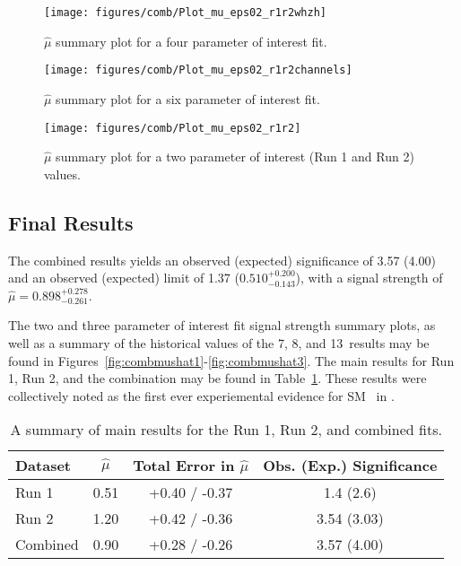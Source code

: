 \begin{figure}[!htbp]\captionsetup{justification=centering}
  \begin{center}
  \texttt{[image: figures/comb/Plot\_mu\_eps02\_r1r2whzh]}
  \caption{$\hat{\mu}$ summary plot for a four parameter of interest fit.}
  \label{fig:combmushat4}
  \end{center}
\end{figure}

\begin{figure}[!htbp]\captionsetup{justification=centering}
  \begin{center}
  \texttt{[image: figures/comb/Plot\_mu\_eps02\_r1r2channels]}
  \caption{$\hat{\mu}$ summary plot for a six parameter of interest fit.}
  \label{fig:combmushat5}
  \end{center}
\end{figure}

\begin{figure}[!htbp]\captionsetup{justification=centering}
  \begin{center}
  \texttt{[image: figures/comb/Plot\_mu\_eps02\_r1r2]}
  \caption{$\hat{\mu}$ summary plot for a two parameter of interest (Run 1 and Run 2) values.}
  \label{fig:combmushat6}
  \end{center}
\end{figure}

\subsection{Final Results}
The combined results yields an observed (expected) significance of 3.57 (4.00) and an observed (expected) limit of 1.37 ($0.510^{+0.200}_{-0.143}$), with a signal strength of $\hat{\mu}=0.898^{+0.278}_{-0.261}$.

The two and three parameter of interest fit signal strength summary plots, as well as a summary of the historical values of the 7, 8, and 13 \TeV\,results may be found in Figures~\ref{fig:combmushat1}-\ref{fig:combmushat3}.  The main results for Run 1, Run 2, and the combination may be found in Table~\ref{tableCombresykts}.  These results were collectively noted as the first ever experiemental evidence for SM \vhbb\, in \cite{paper}.

\begin{table}[!htbp]\captionsetup{justification=centering}
\begin{center}
\begin{tabular}{lccc} \hline\hline
Dataset & $\hat{\mu}$ & Total Error in $\hat{\mu}$ & Obs. (Exp.) Significance \\
\hline
Run 1 & 0.51 & +0.40 / -0.37 & 1.4 (2.6)\\
Run 2 & 1.20 & +0.42 / -0.36 & 3.54 (3.03)\\
Combined & 0.90 & +0.28 / -0.26 & 3.57 (4.00)\\
\hline\hline
\end{tabular}
\caption{A summary of main results for the Run 1, Run 2, and combined fits.}
\label{tableCombresykts}
\end{center}
\end{table}


